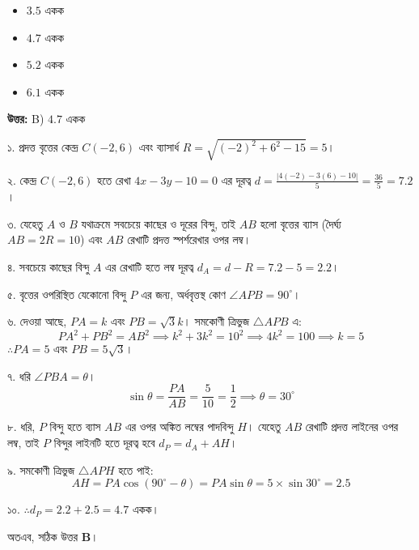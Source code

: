 \documentclass[12pt, a4paper]{article}
\begin{document}
\vspace{1em}
\begin{itemize}[label={}, leftmargin=1cm, itemsep=0.5em]
    \item[\textbf{A)}] $3.5$ একক
    \item[\textbf{B)}] $4.7$ একক
    \item[\textbf{C)}] $5.2$ একক
    \item[\textbf{D)}] $6.1$ একক
\end{itemize}

\vspace{0.5em}
\begin{tcolorbox}[answerbox]
    \textbf{\color{success} উত্তর:} B) $4.7$ একক
\end{tcolorbox}
\vspace{1em}

\begin{tcolorbox}[solutionbox={সমাধান (Solution)}]
    \noindent
    ১. প্রদত্ত বৃত্তের কেন্দ্র $C(-2, 6)$ এবং ব্যাসার্ধ $R = \sqrt{(-2)^2 + 6^2 - 15} = 5$। 
    
    ২. কেন্দ্র $C(-2, 6)$ হতে রেখা $4x - 3y - 10 = 0$ এর দূরত্ব $d = \frac{|4(-2) - 3(6) - 10|}{5} = \frac{36}{5} = 7.2$। 
    
    ৩. যেহেতু $A$ ও $B$ যথাক্রমে সবচেয়ে কাছের ও দূরের বিন্দু, তাই $AB$ হলো বৃত্তের ব্যাস (দৈর্ঘ্য $AB = 2R = 10$) এবং $AB$ রেখাটি প্রদত্ত স্পর্শরেখার ওপর লম্ব। 
    
    ৪. সবচেয়ে কাছের বিন্দু $A$ এর রেখাটি হতে লম্ব দূরত্ব $d_A = d - R = 7.2 - 5 = 2.2$। 
    
    ৫. বৃত্তের ওপরিস্থিত যেকোনো বিন্দু $P$ এর জন্য, অর্ধবৃত্তস্থ কোণ $\angle APB = 90^{\circ}$। 
    
    ৬. দেওয়া আছে, $PA = k$ এবং $PB = \sqrt{3}k$। সমকোণী ত্রিভুজ $\triangle APB$ এ: 
    \[ PA^2 + PB^2 = AB^2 \implies k^2 + 3k^2 = 10^2 \implies 4k^2 = 100 \implies k = 5 \]
    $\therefore PA = 5$ এবং $PB = 5\sqrt{3}$। 
    
    ৭. ধরি $\angle PBA = \theta$। 
    \[ \sin\theta = \frac{PA}{AB} = \frac{5}{10} = \frac{1}{2} \implies \theta = 30^{\circ} \]
    
    ৮. ধরি, $P$ বিন্দু হতে ব্যাস $AB$ এর ওপর অঙ্কিত লম্বের পাদবিন্দু $H$। যেহেতু $AB$ রেখাটি প্রদত্ত লাইনের ওপর লম্ব, তাই $P$ বিন্দুর লাইনটি হতে দূরত্ব হবে $d_P = d_A + AH$। 
    
    ৯. সমকোণী ত্রিভুজ $\triangle APH$ হতে পাই: 
    \[ AH = PA \cos(90^{\circ} - \theta) = PA \sin\theta = 5 \times \sin 30^{\circ} = 2.5 \]
    
    ১০. $\therefore d_P = 2.2 + 2.5 = 4.7$ একক। 
    
    অতএব, সঠিক উত্তর \textbf{B}।
\end{tcolorbox}
\end{document}
